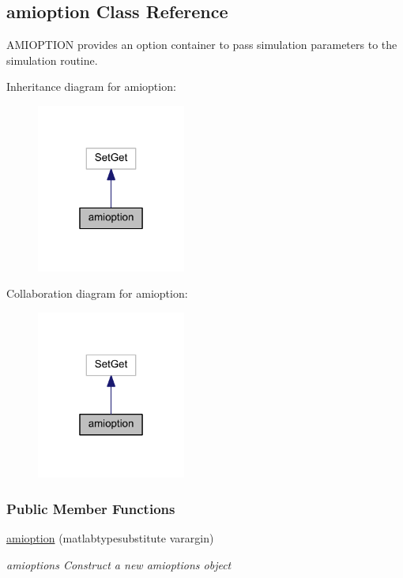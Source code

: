 \hypertarget{classamioption}{}\subsection{amioption Class Reference}
\label{classamioption}


A\+M\+I\+O\+P\+T\+I\+O\+N provides an option container to pass simulation parameters to the simulation routine.  




Inheritance diagram for amioption\+:\nopagebreak
\begin{figure}[H]
\begin{center}
\leavevmode
\includegraphics[width=139pt]{classamioption__inherit__graph}
\end{center}
\end{figure}


Collaboration diagram for amioption\+:\nopagebreak
\begin{figure}[H]
\begin{center}
\leavevmode
\includegraphics[width=139pt]{classamioption__coll__graph}
\end{center}
\end{figure}
\subsubsection*{Public Member Functions}
\begin{DoxyCompactItemize}
\item 
\hyperlink{classamioption_a86c655c4010c1c2ddb3e68693a07ef37}{amioption} (matlabtypesubstitute varargin)
\begin{DoxyCompactList}\small\item\em amioptions Construct a new amioptions object \end{DoxyCompactList}\end{DoxyCompactItemize}
